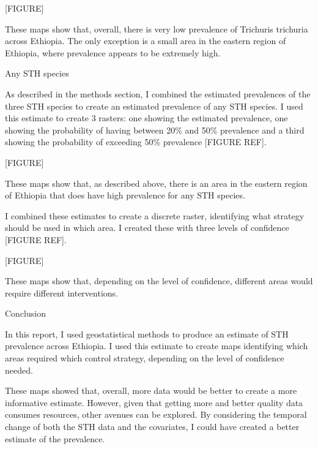\documentclass[
]{article}
\begin{document}
{[}FIGURE{]}

These maps show that, overall, there is very low prevalence of Trichuris
trichuria across Ethiopia. The only exception is a small area in the
eastern region of Ethiopia, where prevalence appears to be extremely
high.

Any STH species

As described in the methods section, I combined the estimated
prevalences of the three STH species to create an estimated prevalence
of any STH species. I used this estimate to create 3 rasters: one
showing the estimated prevalence, one showing the probability of having
between 20\% and 50\% prevalence and a third showing the probability of
exceeding 50\% prevalence {[}FIGURE REF{]}.

{[}FIGURE{]}

These maps show that, as described above, there is an area in the
eastern region of Ethiopia that does have high prevalence for any STH
species.

I combined these estimates to create a discrete raster, identifying what
strategy should be used in which area. I created these with three levels
of confidence {[}FIGURE REF{]}.

{[}FIGURE{]}

These maps show that, depending on the level of confidence, different
areas would require different interventions.

Conclusion

In this report, I used geostatistical methods to produce an estimate of
STH prevalence across Ethiopia. I used this estimate to create maps
identifying which areas required which control strategy, depending on
the level of confidence needed.

These maps showed that, overall, more data would be better to create a
more informative estimate. However, given that getting more and better
quality data consumes resources, other avenues can be explored. By
considering the temporal change of both the STH data and the covariates,
I could have created a better estimate of the prevalence.
\end{document}

